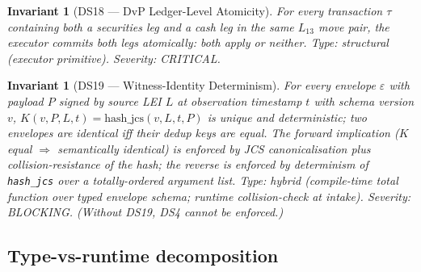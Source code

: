 \documentclass[11pt,a4paper]{article}
\newtheorem{invariant}[definition]{Invariant}
\begin{document}
\begin{invariant}[DS18 --- DvP Ledger-Level Atomicity]
\label{inv:DS18}
For every transaction $\tau$ containing both a securities leg and a cash leg in the same $L_{13}$ move pair, the executor commits both legs atomically: both apply or neither.
\textit{Type:} structural (executor primitive). \textit{Severity:} CRITICAL.
\end{invariant}

\begin{invariant}[DS19 --- Witness-Identity Determinism]
\label{inv:DS19}
For every envelope $\varepsilon$ with payload $P$ signed by source LEI $L$ at observation timestamp $t$ with schema version $v$, $K(v, P, L, t) = \mathrm{hash\_jcs}(v, L, t, P)$ is unique and deterministic; two envelopes are identical iff their dedup keys are equal. The forward implication ($K$ equal $\Rightarrow$ semantically identical) is enforced by JCS canonicalisation plus collision-resistance of the hash; the reverse is enforced by determinism of \texttt{hash\_jcs} over a totally-ordered argument list.
\textit{Type:} hybrid (compile-time total function over typed envelope schema; runtime collision-check at intake). \textit{Severity:} BLOCKING. (Without DS19, DS4 cannot be enforced.)
\end{invariant}

\subsection*{Type-vs-runtime decomposition}
\end{document}
